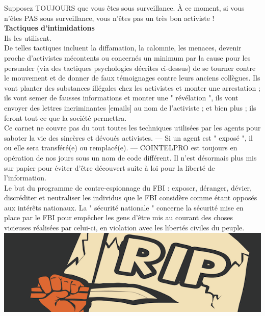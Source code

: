 \documentclass[11pt,twoside,a4paper]{article}
\begin{document}
Supposez TOUJOURS que vous {\^e}tes sous surveillance. {\`A} ce moment, si vous n'{\^e}tes PAS sous surveillance, vous n'{\^e}tes pas un tr{\`e}s bon activiste !~\\

\textbf{\large Tactiques d'intimidations}~\\

Ils les utilisent.~\\

De telles tactiques incluent la diffamation, la calomnie, les menaces, devenir proche d'activistes m{\'e}contents ou concern{\'e}s un minimum par la cause pour les persuader (via des tactiques psychologies d{\'e}crites ci-dessus) de se tourner contre le mouvement et de donner de faux t{\'e}moignages contre leurs anciens coll{\`e}gues. Ils vont planter des substances ill{\'e}gales chez les activistes et monter une arrestation ; ils vont semer de fausses informations et monter une " r{\'e}v{\'e}lation ", ils vont envoyer des lettres incriminantes [emails] au nom de l'activiste ; et bien plus ; ils feront tout ce que la soci{\'e}t{\'e} permettra.~\\

Ce carnet ne couvre pas du tout toutes les techniques utilis{\'e}es par les agents pour saboter la vie des sinc{\`e}res et d{\'e}vou{\'e}s activistes. --- Si un agent est " expos{\'e} ", il ou elle sera transf{\'e}r{\'e}(e) ou remplac{\'e}(e). --- COINTELPRO est toujours en op{\'e}ration de nos jours sous un nom de code diff{\'e}rent. Il n'est d{\'e}sormais plus mis sur papier pour {\'e}viter d'{\^e}tre d{\'e}couvert suite {\`a} loi pour la libert{\'e} de l'information.~\\

Le but du programme de contre-espionnage du FBI : exposer, d{\'e}ranger, d{\'e}vier, discr{\'e}diter et neutraliser les individus que le FBI consid{\`e}re comme {\'e}tant oppos{\'e}s aux int{\'e}r{\^e}ts nationaux. La " s{\'e}curit{\'e} nationale " concerne la s{\'e}curit{\'e} mise en place par le FBI pour emp{\^e}cher les gens d'{\^e}tre mis au courant des choses vicieuses r{\'e}alis{\'e}es par celui-ci, en violation avec les libert{\'e}s civiles du peuple.~\\

\includegraphics[width=\textwidth]{img/rip.png}
\end{document}
